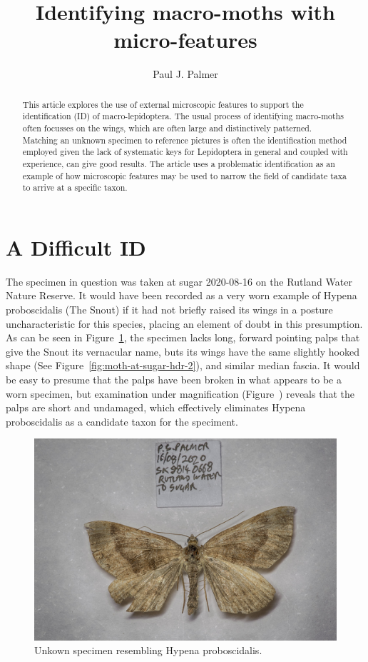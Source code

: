 \documentclass[]{article}
\title{Identifying macro-moths with micro-features}
\author{Paul J. Palmer}
\begin{document}
\maketitle

\begin{abstract}

This article explores the use of external microscopic features to support the identification (ID) of  macro-lepidoptera. The usual process of identifying macro-moths often focusses on the wings, which are often large and distinctively patterned. Matching an unknown specimen to reference pictures is often the identification method employed given the lack of systematic keys for Lepidoptera in general and coupled with experience, can give good results. The article uses a problematic identification as an example of how microscopic features may be used to narrow the field of candidate taxa to arrive at a specific taxon. 

\end{abstract}

\section*{A Difficult ID}
The specimen in question was taken at sugar 2020-08-16 on the Rutland Water Nature Reserve. It would have been recorded as a very worn example of Hypena proboscidalis (The Snout) if it had not briefly raised its wings in a posture uncharacteristic for this species, placing an element of doubt in this presumption. As can be seen in Figure~\ref{fig:202009131026pjp-1}, the specimen lacks long, forward pointing palps that give the Snout its vernacular name, buts its wings have the same slightly hooked shape (See Figure~\ref{fig:moth-at-sugar-hdr-2}), and similar median fascia. It would be easy to presume that the palps have been broken in what appears to be a worn specimen, but examination under magnification (Figure~) reveals that the palps are short and undamaged, which effectively eliminates Hypena proboscidalis as a candidate taxon for the speciment.

\begin{figure}
	\centering
	\includegraphics[width=0.5\linewidth]{images/202009131026PJP-1}
	\caption{Unkown specimen resembling Hypena proboscidalis.}
	\label{fig:202009131026pjp-1}
\end{figure}
\end{document}
